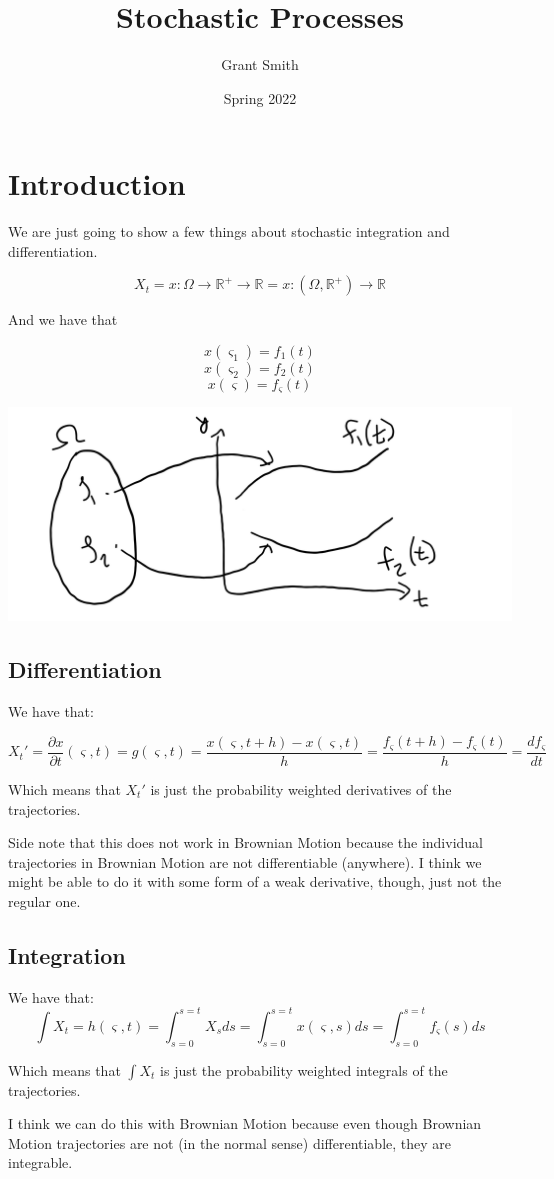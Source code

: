\documentclass{article}
\title{Stochastic Processes}
\author{Grant Smith }
\date{Spring 2022}
\begin{document}
\maketitle

\section{Introduction}
We are just going to show a few things about stochastic integration and differentiation.

$$X_t = x : \Omega \rightarrow \mathbb{R}^+ \rightarrow  \mathbb{R} = x :  \left(\Omega  , \mathbb{R}^+\right)\rightarrow  \mathbb{R}$$ 

And we have that

$$x(\varsigma_1) = f_1(t)$$
$$x(\varsigma_2) = f_2(t)$$
$$x(\varsigma) = f_\varsigma(t)$$

\includegraphics[width=\textwidth]{stochastic_ image.png}

\newpage

\subsection{Differentiation}
We have that:

$$X_t' = \frac{\partial x}{\partial t}\left(\varsigma, t\right)=g\left(\varsigma, t\right) = \frac{x\left(\varsigma, t + h\right) - x\left(\varsigma, t\right)}{h} = \frac{f_\varsigma\left(t + h\right) - f_\varsigma\left(t\right)}{h} = \frac{df_\varsigma}{dt}$$

Which means that $X_t'$ is just the probability weighted derivatives of the trajectories.

Side note that this does not work in Brownian Motion because the individual trajectories in Brownian Motion are not differentiable (anywhere).  I think we might be able to do it with some form of a weak derivative, though, just not the regular one.

\subsection{Integration}
We have that:
$$\int X_t = h\left(\varsigma,t\right)= \int_{s = 0}^{s = t} X_s ds = \int_{s = 0}^{s = t} x\left(\varsigma,s\right) ds = \int_{s = 0}^{s = t} f_\varsigma\left(s\right) ds $$

Which means that $\int X_t$ is just the probability weighted integrals of the trajectories.

I think we can do this with Brownian Motion because even though Brownian Motion trajectories are not (in the normal sense) differentiable, they are integrable.
\end{document}
